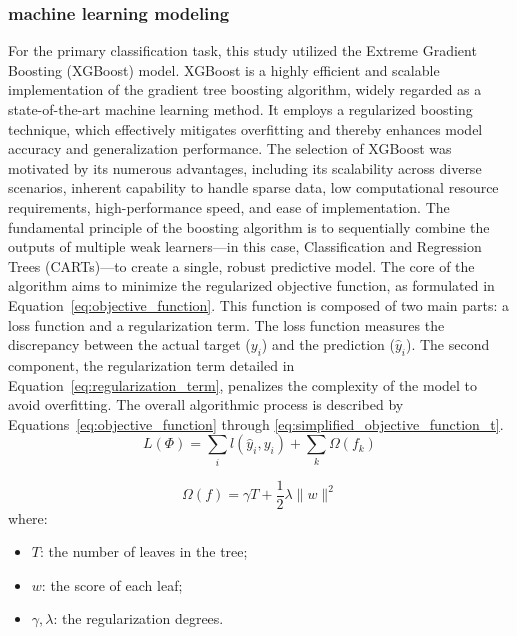 \subsubsection{machine learning modeling}
For the primary classification task, this study utilized the Extreme Gradient Boosting (XGBoost) model\cite{mthd05}. XGBoost is a highly efficient and scalable implementation of the gradient tree boosting algorithm, widely regarded as a state-of-the-art machine learning method. It employs a regularized boosting technique, which effectively mitigates overfitting and thereby enhances model accuracy and generalization performance. The selection of XGBoost was motivated by its numerous advantages, including its scalability across diverse scenarios, inherent capability to handle sparse data, low computational resource requirements, high-performance speed, and ease of implementation. The fundamental principle of the boosting algorithm is to sequentially combine the outputs of multiple weak learners---in this case, Classification and Regression Trees (CARTs)---to create a single, robust predictive model. The core of the algorithm aims to minimize the regularized objective function, as formulated in Equation~\ref{eq:objective_function}. This function is composed of two main parts: a loss function and a regularization term. The loss function measures the discrepancy between the actual target ($y_i$) and the prediction ($\hat{y}_i$). The second component, the regularization term detailed in Equation~\ref{eq:regularization_term}, penalizes the complexity of the model to avoid overfitting. The overall algorithmic process is described by Equations~\ref{eq:objective_function} through \ref{eq:simplified_objective_function_t}.
\begin{equation} \label{eq:objective_function}
L(\Phi) = \sum_i l(\hat{y}_i, y_i) + \sum_k \Omega(f_k)
\end{equation}

\begin{equation} \label{eq:regularization_term}
\Omega(f) = \gamma T + \frac{1}{2} \lambda \|w\|^2
\end{equation}
where:
\begin{itemize}
    \item $T$: the number of leaves in the tree;
    \item $w$: the score of each leaf;
    \item $\gamma, \lambda$: the regularization degrees.
\end{itemize}


